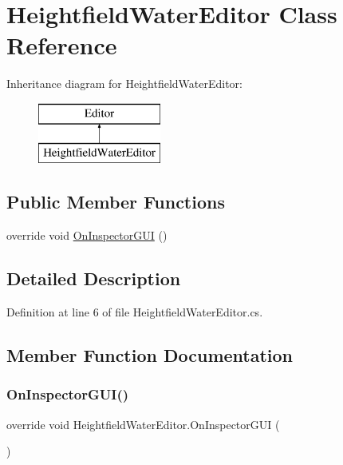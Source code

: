 \hypertarget{class_heightfield_water_editor}{}\section{Heightfield\+Water\+Editor Class Reference}
\label{class_heightfield_water_editor}
Inheritance diagram for Heightfield\+Water\+Editor\+:\begin{figure}[H]
\begin{center}
\leavevmode
\includegraphics[height=2.000000cm]{class_heightfield_water_editor}
\end{center}
\end{figure}
\subsection*{Public Member Functions}
\begin{DoxyCompactItemize}
\item 
override void \mbox{\hyperlink{class_heightfield_water_editor_aef4b40c97c4132e2b89db29e14094b52}{On\+Inspector\+G\+UI}} ()
\end{DoxyCompactItemize}


\subsection{Detailed Description}


Definition at line 6 of file Heightfield\+Water\+Editor.\+cs.



\subsection{Member Function Documentation}
\mbox{\label{class_heightfield_water_editor_aef4b40c97c4132e2b89db29e14094b52}} 
\subsubsection{\texorpdfstring{On\+Inspector\+G\+U\+I()}{OnInspectorGUI()}}
{\footnotesize\ttfamily override void Heightfield\+Water\+Editor.\+On\+Inspector\+G\+UI (\begin{DoxyParamCaption}{ }\end{DoxyParamCaption})}



